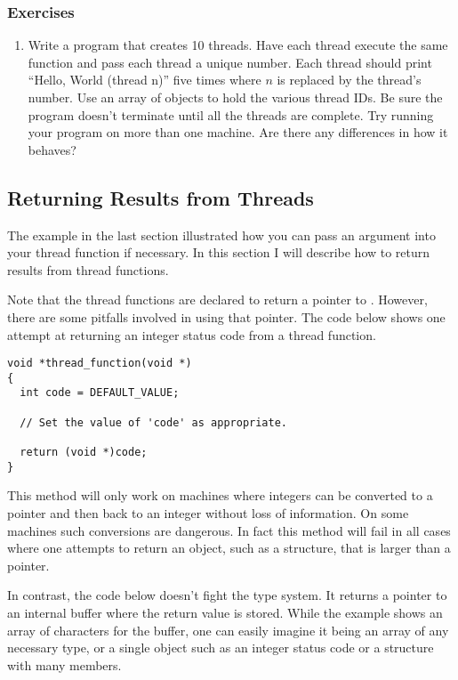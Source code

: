 \subsubsection*{Exercises}

\begin{enumerate}

\item Write a program that creates 10 threads. Have each thread execute the same function and
  pass each thread a unique number. Each thread should print ``Hello, World (thread n)'' five
  times where $n$ is replaced by the thread's number. Use an array of 
  objects to hold the various thread IDs. Be sure the program doesn't terminate until all the
  threads are complete. Try running your program on more than one machine. Are there any
  differences in how it behaves?

\end{enumerate}

\subsection{Returning Results from Threads}
\label{subsec:returning-results}

The example in the last section illustrated how you can pass an argument into your thread
function if necessary. In this section I will describe how to return results from thread
functions.

Note that the thread functions are declared to return a pointer to . However,
there are some pitfalls involved in using that pointer. The code below shows one attempt at
returning an integer status code from a thread function.

\begin{lstlisting}
void *thread_function(void *)
{
  int code = DEFAULT_VALUE;

  // Set the value of 'code' as appropriate.

  return (void *)code;
}
\end{lstlisting}

This method will only work on machines where integers can be converted to a pointer and then
back to an integer without loss of information. On some machines such conversions are dangerous.
In fact this method will fail in all cases where one attempts to return an object, such as a
structure, that is larger than a pointer.

In contrast, the code below doesn't fight the type system. It returns a pointer to an internal
buffer where the return value is stored. While the example shows an array of characters for the
buffer, one can easily imagine it being an array of any necessary type, or a single object such
as an integer status code or a structure with many members.

